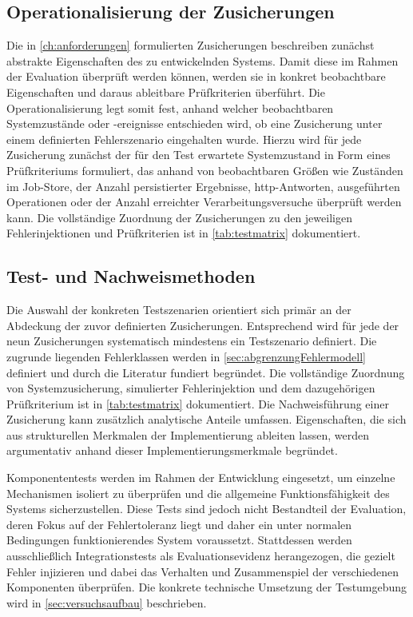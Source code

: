 \subsection{Operationalisierung der Zusicherungen}
\label{subsec:operationalisierung}
Die in \cref{ch:anforderungen} formulierten Zusicherungen beschreiben zunächst abstrakte Eigenschaften des zu entwickelnden Systems.
Damit diese im Rahmen der Evaluation überprüft werden können, werden sie in konkret beobachtbare Eigenschaften und daraus
ableitbare Prüfkriterien überführt.
Die Operationalisierung legt somit fest, anhand welcher beobachtbaren Systemzustände oder -ereignisse entschieden wird,
ob eine Zusicherung unter einem definierten Fehlerszenario eingehalten wurde.
Hierzu wird für jede Zusicherung zunächst der für den Test erwartete Systemzustand in Form eines Prüfkriteriums formuliert,
das anhand von beobachtbaren Größen wie Zuständen im Job-Store, der Anzahl persistierter Ergebnisse, \gls{http}-Antworten, ausgeführten
Operationen oder der Anzahl erreichter Verarbeitungsversuche überprüft werden kann.
Die vollständige Zuordnung der Zusicherungen zu den jeweiligen Fehlerinjektionen und Prüfkriterien ist in \cref{tab:testmatrix}
dokumentiert.

\subsection{Test- und Nachweismethoden}
\label{subsec:test_und_nachweismethoden}
Die Auswahl der konkreten Testszenarien orientiert sich primär an der Abdeckung der zuvor definierten Zusicherungen.
Entsprechend wird für jede der neun Zusicherungen systematisch mindestens ein Testszenario definiert.
Die zugrunde liegenden Fehlerklassen werden in \cref{sec:abgrenzungFehlermodell} definiert und durch die Literatur fundiert begründet.
Die vollständige Zuordnung von Systemzusicherung, simulierter Fehlerinjektion und dem dazugehörigen Prüfkriterium ist in
\cref{tab:testmatrix} dokumentiert.
Die Nachweisführung einer Zusicherung kann zusätzlich analytische Anteile umfassen.
Eigenschaften, die sich aus strukturellen Merkmalen der Implementierung ableiten lassen, werden argumentativ anhand dieser
Implementierungsmerkmale begründet.

Komponententests werden im Rahmen der Entwicklung eingesetzt, um einzelne Mechanismen isoliert zu überprüfen und die allgemeine
Funktionsfähigkeit des Systems sicherzustellen.
Diese Tests sind jedoch nicht Bestandteil der Evaluation, deren Fokus auf der Fehlertoleranz liegt und daher
ein unter normalen Bedingungen funktionierendes System voraussetzt.
Stattdessen werden ausschließlich Integrationstests als Evaluationsevidenz herangezogen, die gezielt Fehler injizieren und
dabei das Verhalten und Zusammenspiel der verschiedenen Komponenten überprüfen.
Die konkrete technische Umsetzung der Testumgebung wird in \cref{sec:versuchsaufbau} beschrieben.

